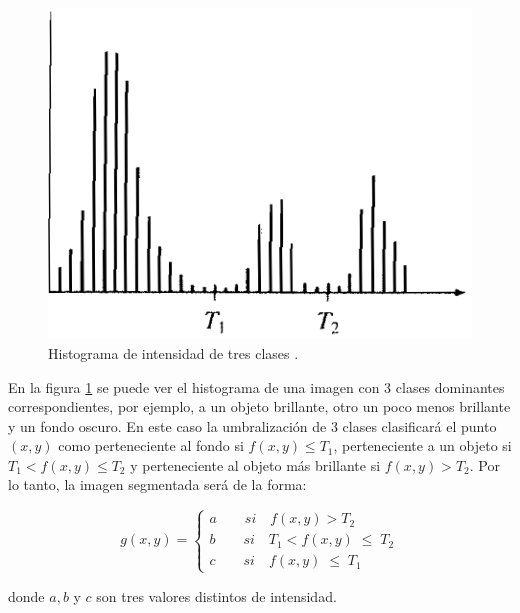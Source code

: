\begin{figure}[hbt]
\begin{center}
\includegraphics[scale=0.35]{img/hist3clases.png}
\end{center}
\vspace{-0.5cm}
\caption{Histograma de intensidad de tres clases \cite{segment}.}
\label{hist3class}
\end{figure}

En la figura \ref{hist3class} se puede ver el histograma de una imagen con 3 clases dominantes correspondientes, por ejemplo, a un objeto brillante, otro un poco menos brillante y un fondo oscuro. En este caso la umbralización de 3 clases clasificará el punto $(x,y)$ como perteneciente al fondo si $f(x,y){\leq}T_1$, perteneciente a un objeto si $T_1 < f(x,y){\leq}T_2$ y perteneciente al objeto más brillante si $f(x,y)>T_2$. Por lo tanto, la imagen segmentada será de la forma:

\begin{equation}
g(x,y) = \left\{
\begin{array}{l}
\displaystyle a{\qquad}si{\quad}f(x,y) > {T_2}\\
\displaystyle b{\qquad}si{\quad}{T_1} < f(x,y)\;{\leq}\;{T_2}\\
\displaystyle c{\qquad}si{\quad}f(x,y)\;{\leq}\;{T_1}
\end{array} 
\right.
\label{eq:xdef3}
\end{equation}

donde $a,b$ y $c $ son tres valores distintos de intensidad.

